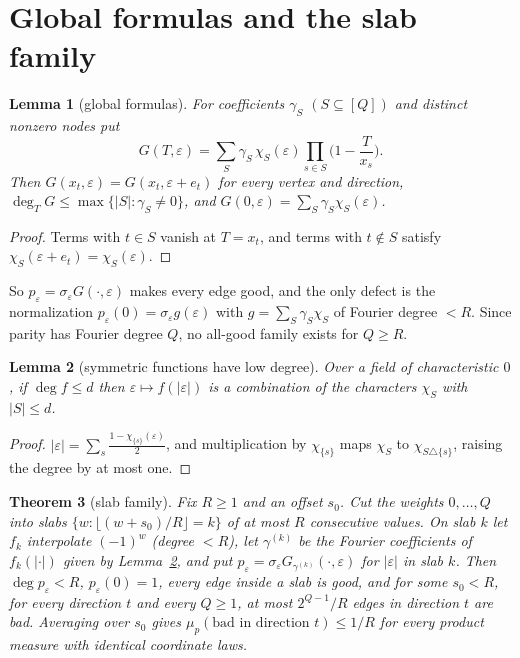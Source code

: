 \documentclass[11pt]{article}
\newtheorem{theorem}{Theorem}
\newtheorem{lemma}[theorem]{Lemma}
\theoremstyle{definition}
\theoremstyle{remark}
\begin{document}
\section{Global formulas and the slab family}\label{sec:slab}

\begin{lemma}[global formulas]\label{lem:global}
For coefficients $\gamma_S$ $(S\subseteq[Q])$ and distinct nonzero nodes put
\[
G(T,\varepsilon)=\sum_S\gamma_S\,\chi_S(\varepsilon)\prod_{s\in S}\Big(1-\frac T{x_s}\Big).
\]
Then $G(x_t,\varepsilon)=G(x_t,\varepsilon+e_t)$ for every vertex and direction, $\deg_TG\le\max\{|S|:\gamma_S\ne0\}$, and $G(0,\varepsilon)=\sum_S\gamma_S\chi_S(\varepsilon)$.
\end{lemma}

\begin{proof}
Terms with $t\in S$ vanish at $T=x_t$, and terms with $t\notin S$ satisfy $\chi_S(\varepsilon+e_t)=\chi_S(\varepsilon)$.
\end{proof}

So $p_\varepsilon=\sigma_\varepsilon G(\cdot,\varepsilon)$ makes every edge good, and the only defect is the normalization $p_\varepsilon(0)=\sigma_\varepsilon g(\varepsilon)$ with $g=\sum_S\gamma_S\chi_S$ of Fourier degree $<R$. Since parity has Fourier degree $Q$, no all-good family exists for $Q\ge R$.

\begin{lemma}[symmetric functions have low degree]\label{lem:symmetric}
Over a field of characteristic $0$, if $\deg f\le d$ then $\varepsilon\mapsto f(|\varepsilon|)$ is a combination of the characters $\chi_S$ with $|S|\le d$.
\end{lemma}

\begin{proof}
$|\varepsilon|=\sum_s\frac{1-\chi_{\{s\}}(\varepsilon)}2$, and multiplication by $\chi_{\{s\}}$ maps $\chi_S$ to $\chi_{S\triangle\{s\}}$, raising the degree by at most one.
\end{proof}

\begin{theorem}[slab family]\label{thm:slab}
Fix $R\ge1$ and an offset $s_0$. Cut the weights $0,\dots,Q$ into slabs $\{w:\lfloor(w+s_0)/R\rfloor=k\}$ of at most $R$ consecutive values. On slab $k$ let $f_k$ interpolate $(-1)^w$ (degree $<R$), let $\gamma^{(k)}$ be the Fourier coefficients of $f_k(|\cdot|)$ given by Lemma~\ref{lem:symmetric}, and put $p_\varepsilon=\sigma_\varepsilon G_{\gamma^{(k)}}(\cdot,\varepsilon)$ for $|\varepsilon|$ in slab $k$. Then $\deg p_\varepsilon<R$, $p_\varepsilon(0)=1$, every edge inside a slab is good, and for some $s_0<R$, for every direction $t$ and every $Q\ge1$, at most $2^{Q-1}/R$ edges in direction $t$ are bad. Averaging over $s_0$ gives $\mu_p(\text{bad in direction }t)\le1/R$ for every product measure with identical coordinate laws.
\end{theorem}
\end{document}

